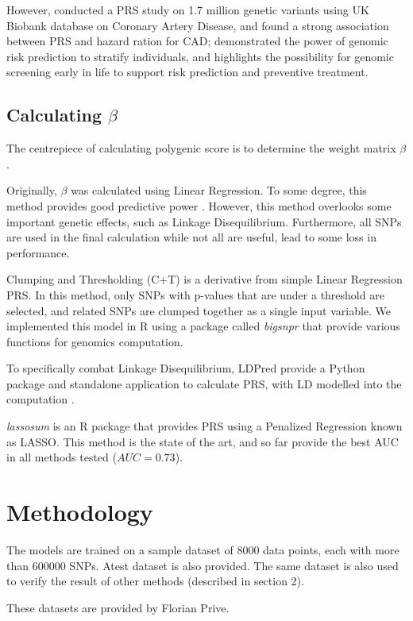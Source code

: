 \documentclass{article}
\begin{document}
However, \cite{Inouye1883} conducted a PRS study on 1.7 million genetic
variants using UK Biobank database on Coronary Artery Disease, and found
a strong association between PRS and hazard ration for CAD; demonstrated
the power of genomic risk prediction to stratify individuals, and highlights the
possibility for genomic screening early in life to support risk prediction and
preventive treatment.

\subsection{Calculating $\beta$}
The centrepiece of calculating polygenic score is to determine the weight matrix $\beta$.

Originally, $\beta$ was calculated using Linear Regression. To some degree, this method
provides good predictive power \cite{Dudbridge2013}. However, this method overlooks some 
important genetic effects, such as Linkage Disequilibrium. Furthermore, all SNPs are 
used in the final calculation while not all are useful, lead to some loss in performance.

Clumping and Thresholding (C+T) is a derivative from simple Linear Regression PRS. 
In this method, only SNPs with p-values that are under a threshold are selected, and 
related SNPs are clumped together as a single input variable. 
We implemented this model in R using a package called \textit{bigsnpr} \cite{bigsnpr} 
that provide various functions for genomics computation.

To specifically combat Linkage Disequilibrium, LDPred provide a Python package and 
standalone application to calculate PRS, with LD modelled into the computation 
\cite{LDpred}.

\textit{lassosum} \cite{doi:10.1002/gepi.22050} is an R package that provides PRS using a 
Penalized Regression known as LASSO. 
This method is the state of the art, and so far provide the best AUC in all methods 
tested ($AUC = 0.73$).

\section{Methodology}

The models are trained on a sample dataset of 8000 data points, each with more than 
$600000$ SNPs. Atest dataset is also provided. The same dataset is also used to verify 
the result of other methods (described in section 2).

These datasets are provided by Florian Prive.
\end{document}
